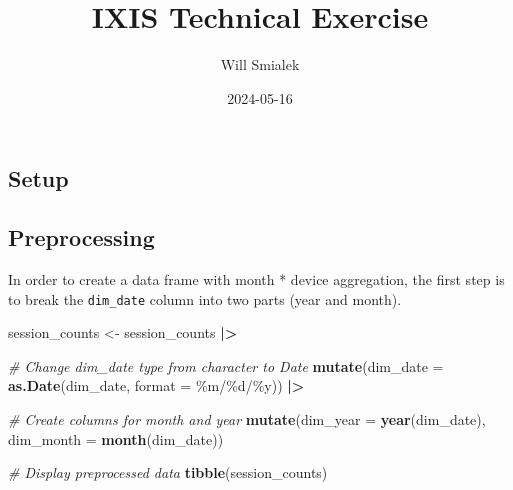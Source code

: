 \documentclass[
]{article}
\title{IXIS Technical Exercise}
\author{Will Smialek}
\date{2024-05-16}
\newenvironment{Shaded}{\begin{snugshade}}{\end{snugshade}}
\newcommand{\AttributeTok}[1]{\textcolor[rgb]{0.13,0.29,0.53}{#1}}
\newcommand{\CommentTok}[1]{\textcolor[rgb]{0.56,0.35,0.01}{\textit{#1}}}
\newcommand{\ConstantTok}[1]{\textcolor[rgb]{0.56,0.35,0.01}{#1}}
\newcommand{\FunctionTok}[1]{\textcolor[rgb]{0.13,0.29,0.53}{\textbf{#1}}}
\newcommand{\NormalTok}[1]{#1}
\newcommand{\OtherTok}[1]{\textcolor[rgb]{0.56,0.35,0.01}{#1}}
\newcommand{\SpecialCharTok}[1]{\textcolor[rgb]{0.81,0.36,0.00}{\textbf{#1}}}
\newcommand{\StringTok}[1]{\textcolor[rgb]{0.31,0.60,0.02}{#1}}
\begin{document}
\maketitle

\hypertarget{setup}{%
\subsection{Setup}\label{setup}}

\begin{Shaded}
\end{Shaded}

\hypertarget{preprocessing}{%
\subsection{Preprocessing}\label{preprocessing}}

In order to create a data frame with month * device aggregation, the
first step is to break the \texttt{dim\_date} column into two parts
(year and month).

\begin{Shaded}
\begin{Highlighting}[]
\NormalTok{session\_counts }\OtherTok{\textless{}{-}}\NormalTok{ session\_counts }\SpecialCharTok{|\textgreater{}}
  
  \CommentTok{\# Change dim\_date type from character to Date}
  \FunctionTok{mutate}\NormalTok{(}\AttributeTok{dim\_date =} \FunctionTok{as.Date}\NormalTok{(dim\_date, }\AttributeTok{format =} \StringTok{\textquotesingle{}\%m/\%d/\%y\textquotesingle{}}\NormalTok{)) }\SpecialCharTok{|\textgreater{}}
  
  \CommentTok{\# Create columns for month and year}
  \FunctionTok{mutate}\NormalTok{(}\AttributeTok{dim\_year =} \FunctionTok{year}\NormalTok{(dim\_date),}
         \AttributeTok{dim\_month =} \FunctionTok{month}\NormalTok{(dim\_date))}

\CommentTok{\# Display preprocessed data}
\FunctionTok{tibble}\NormalTok{(session\_counts)}
\end{Highlighting}
\end{Shaded}
\end{document}
